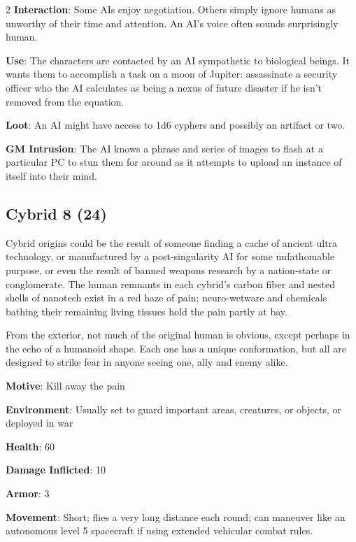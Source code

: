 \begin{multicols}{2}
\textbf{Interaction}: Some AIs enjoy negotiation. Others simply ignore humans as unworthy of their time and attention. An AI’s voice often sounds surprisingly human. 

\textbf{Use}: The characters are contacted by an AI sympathetic to biological beings. It wants them to accomplish a task on a moon of Jupiter: assassinate a security officer who the AI calculates as being a nexus of future disaster if he isn’t removed from the equation. 

\textbf{Loot}: An AI might have access to 1d6 cyphers and possibly an artifact or two.

\textbf{GM Intrusion}: The AI knows a phrase and series of images to flash at a particular PC to stun them for around as it attempts to upload an instance of itself into their mind.

\subsection{Cybrid 8 (24)}

Cybrid origins could be the result of someone finding a cache of ancient ultra technology, or manufactured by a post-singularity AI for some unfathomable purpose, or even the result of banned weapons research by a nation-state or conglomerate. The human remnants in each cybrid’s carbon fiber and nested shells of nanotech exist in a red haze of pain; neuro-wetware and chemicals bathing their remaining living tissues hold the pain partly at bay. 

From the exterior, not much of the original human is obvious, except perhaps in the echo of a humanoid shape. Each one has a unique conformation, but all are designed to strike fear in anyone seeing one, ally and enemy alike. 

\textbf{Motive}: Kill away the pain 

\textbf{Environment}: Usually set to guard important areas, creatures, or objects, or deployed in war 

\textbf{Health}: 60 

\textbf{Damage Inflicted}:  10 

\textbf{Armor}: 3 

\textbf{Movement}: Short; flies a very long distance each round; can maneuver like an autonomous level 5 spacecraft if using extended vehicular combat rules. 


\end{multicols}
